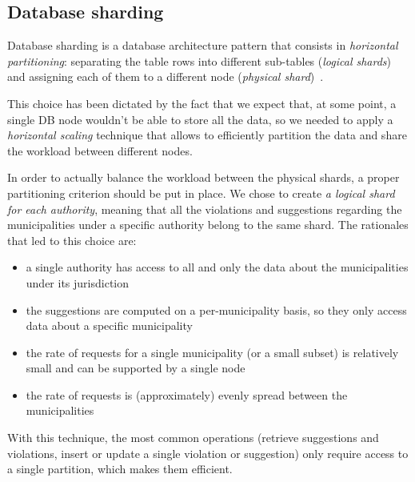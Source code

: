 \subsection{Database sharding}
\label{subsec:db_sharding}
Database sharding is a database architecture pattern that consists in
\emph{horizontal partitioning}: separating the table rows into different
sub-tables (\emph{logical shards}) and assigning each of them to
a different node (\emph{physical shard})~\cite{digitalocean:db-sharding}.

This choice has been dictated by the fact that we expect that, at some point,
a single DB node wouldn't be able to store all the data, so we needed to apply
a \emph{horizontal scaling} technique that allows to efficiently partition the
data and share the workload between different nodes.

In order to actually balance the workload between the physical shards, a proper
partitioning criterion should be put in place.
We chose to create \emph{a logical shard for each authority}, meaning that
all the violations and suggestions regarding the municipalities under a specific
authority belong to the same shard. The rationales that led to this choice are:
\begin{itemize}
    \item a single authority has access to all and only the data about the
    municipalities under its jurisdiction
    \item the suggestions are computed on a per-municipality basis, so they
    only access data about a specific municipality
    \item the rate of requests for a single municipality (or a small subset)
    is relatively small and can be supported by a single node
    \item the rate of requests is (approximately) evenly spread between
    the municipalities
\end{itemize}
With this technique, the most common operations (retrieve suggestions and
violations, insert or update a single violation or suggestion) only require
access to a single partition, which makes them efficient.